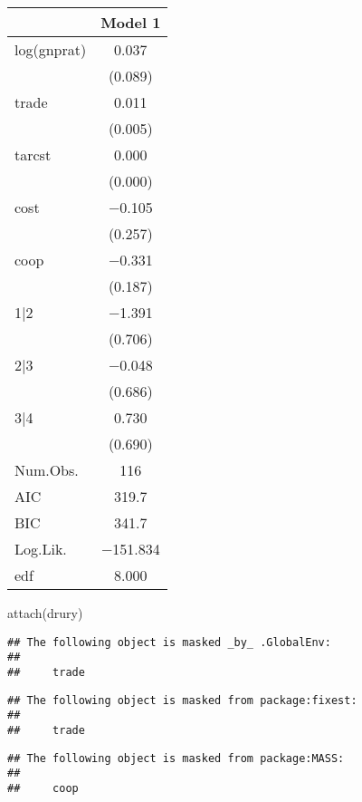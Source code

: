 \documentclass[
]{article}
\newenvironment{Shaded}{\begin{snugshade}}{\end{snugshade}}
\newcommand{\FunctionTok}[1]{\textcolor[rgb]{0.00,0.00,0.00}{#1}}
\newcommand{\NormalTok}[1]{#1}
\begin{document}
\begin{table}
\centering
\begin{tabular}[t]{lc}
\toprule
  & Model 1\\
\midrule
log(gnprat) & \num{0.037}\\
 & (\num{0.089})\\
trade & \num{0.011}\\
 & (\num{0.005})\\
tarcst & \num{0.000}\\
 & (\num{0.000})\\
cost & \num{-0.105}\\
 & (\num{0.257})\\
coop & \num{-0.331}\\
 & (\num{0.187})\\
1|2 & \num{-1.391}\\
 & (\num{0.706})\\
2|3 & \num{-0.048}\\
 & (\num{0.686})\\
3|4 & \num{0.730}\\
 & (\num{0.690})\\
\midrule
Num.Obs. & \num{116}\\
AIC & \num{319.7}\\
BIC & \num{341.7}\\
Log.Lik. & \num{-151.834}\\
edf & \num{8.000}\\
\bottomrule
\end{tabular}
\end{table}

\begin{Shaded}
\begin{Highlighting}[]
\FunctionTok{attach}\NormalTok{(drury)}
\end{Highlighting}
\end{Shaded}

\begin{verbatim}
## The following object is masked _by_ .GlobalEnv:
## 
##     trade
\end{verbatim}

\begin{verbatim}
## The following object is masked from package:fixest:
## 
##     trade
\end{verbatim}

\begin{verbatim}
## The following object is masked from package:MASS:
## 
##     coop
\end{verbatim}
\end{document}
